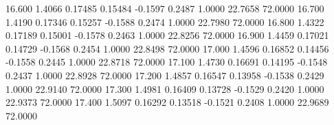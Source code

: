   16.600   1.4066   0.17485   0.15484  -0.1597   0.2487   1.0000  22.7658  72.0000
  16.700   1.4190   0.17346   0.15257  -0.1588   0.2474   1.0000  22.7980  72.0000
  16.800   1.4322   0.17189   0.15001  -0.1578   0.2463   1.0000  22.8256  72.0000
  16.900   1.4459   0.17021   0.14729  -0.1568   0.2454   1.0000  22.8498  72.0000
  17.000   1.4596   0.16852   0.14456  -0.1558   0.2445   1.0000  22.8718  72.0000
  17.100   1.4730   0.16691   0.14195  -0.1548   0.2437   1.0000  22.8928  72.0000
  17.200   1.4857   0.16547   0.13958  -0.1538   0.2429   1.0000  22.9140  72.0000
  17.300   1.4981   0.16409   0.13728  -0.1529   0.2420   1.0000  22.9373  72.0000
  17.400   1.5097   0.16292   0.13518  -0.1521   0.2408   1.0000  22.9689  72.0000

